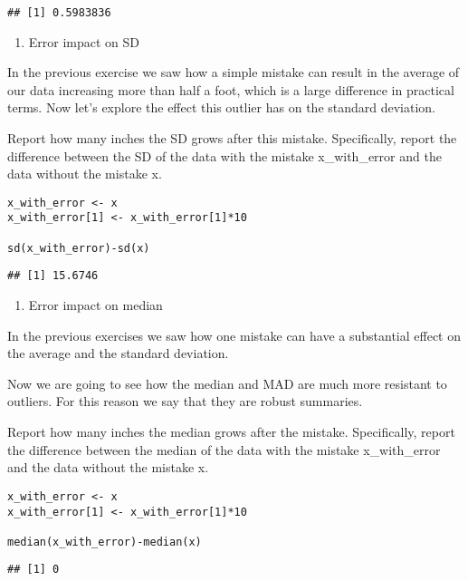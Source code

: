 \documentclass[]{article}
\providecommand{\tightlist}{%
  \setlength{\itemsep}{0pt}\setlength{\parskip}{0pt}}
\begin{document}
\begin{verbatim}
## [1] 0.5983836
\end{verbatim}

\begin{enumerate}
\def\labelenumi{\arabic{enumi}.}
\setcounter{enumi}{3}
\tightlist
\item
  Error impact on SD
\end{enumerate}

In the previous exercise we saw how a simple mistake can result in the
average of our data increasing more than half a foot, which is a large
difference in practical terms. Now let's explore the effect this outlier
has on the standard deviation.

Report how many inches the SD grows after this mistake. Specifically,
report the difference between the SD of the data with the mistake
x\_with\_error and the data without the mistake x.

\begin{verbatim}
x_with_error <- x
x_with_error[1] <- x_with_error[1]*10

sd(x_with_error)-sd(x)
\end{verbatim}

\begin{verbatim}
## [1] 15.6746
\end{verbatim}

\begin{enumerate}
\def\labelenumi{\arabic{enumi}.}
\setcounter{enumi}{4}
\tightlist
\item
  Error impact on median
\end{enumerate}

In the previous exercises we saw how one mistake can have a substantial
effect on the average and the standard deviation.

Now we are going to see how the median and MAD are much more resistant
to outliers. For this reason we say that they are robust summaries.

Report how many inches the median grows after the mistake. Specifically,
report the difference between the median of the data with the mistake
x\_with\_error and the data without the mistake x.

\begin{verbatim}
x_with_error <- x
x_with_error[1] <- x_with_error[1]*10

median(x_with_error)-median(x)
\end{verbatim}

\begin{verbatim}
## [1] 0
\end{verbatim}
\end{document}
